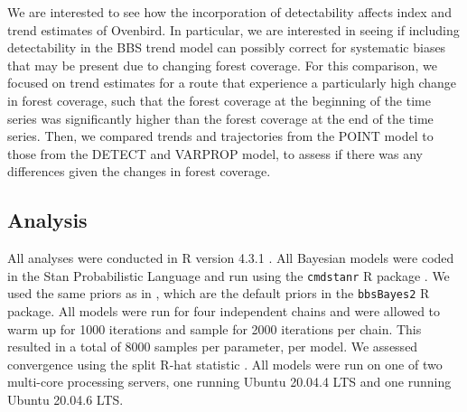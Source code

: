 \documentclass[12pt]{article}
\begin{document}
\par We are interested to see how the incorporation of detectability affects index and trend estimates of Ovenbird.
In particular, we are interested in seeing if including detectability in the BBS trend model can possibly correct for systematic biases that may be present due to changing forest coverage.
For this comparison, we focused on trend estimates for a route that experience a particularly high change in forest coverage, such that the forest coverage at the beginning of the time series was significantly higher than the forest coverage at the end of the time series.
Then, we compared trends and trajectories from the POINT model to those from the DETECT and VARPROP model, to assess if there was any differences given the changes in forest coverage.

\subsection{Analysis}
\par All analyses were conducted in R version 4.3.1 \citep{r_core_team_r_2024}.
All Bayesian models were coded in the Stan Probabilistic Language \citep{stan_development_team_stan_2024} and run using the \texttt{cmdstanr} R package \citep{gabry_cmdstanr_2023}.
We used the same priors as in \citet{smith_spatially_2023}, which are the default priors in the \texttt{bbsBayes2} R package.
All models were run for four independent chains and were allowed to warm up for 1000 iterations and sample for 2000 iterations per chain.
This resulted in a total of 8000 samples per parameter, per model.
We assessed convergence using the split R-hat statistic \citep{vehtari_rank-normalization_2021}.
All models were run on one of two multi-core processing servers, one running Ubuntu 20.04.4 LTS and one running Ubuntu 20.04.6 LTS.
\end{document}
